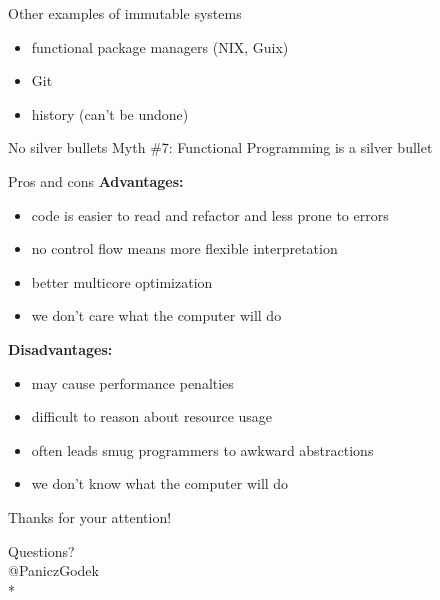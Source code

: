 \documentclass{beamer}
\begin{document}
\begin{frame}{Other examples of immutable systems} \pause
  \begin{itemize}
    \item functional package managers (NIX, Guix) \pause
    \item Git \pause
    \item history (can't be undone)
  \end{itemize}
\end{frame}

\begin{frame}{No silver bullets} \pause
  Myth \#7: Functional Programming is a silver bullet
\end{frame}

\begin{frame}{Pros and cons} \pause
  \textbf{Advantages:} \pause
  \begin{itemize}
  \item code is easier to read and refactor and less prone to errors \pause
  \item no control flow means more flexible interpretation \pause
  \item better multicore optimization \pause
  \item we don't care what the computer will do \pause
  \end{itemize}

  \textbf{Disadvantages:} \pause
  \begin{itemize}
  \item may cause performance penalties \pause
  \item difficult to reason about resource usage \pause
  \item often leads smug programmers to awkward abstractions \pause
  \item we don't know what the computer will do
  \end{itemize}
\end{frame}

\begin{frame}{Thanks for your attention!}
  \begin{center}
    \huge{Questions?}\\%
    \normalsize{@PaniczGodek}\\*
  \end{center}
\end{frame}
\end{document}
